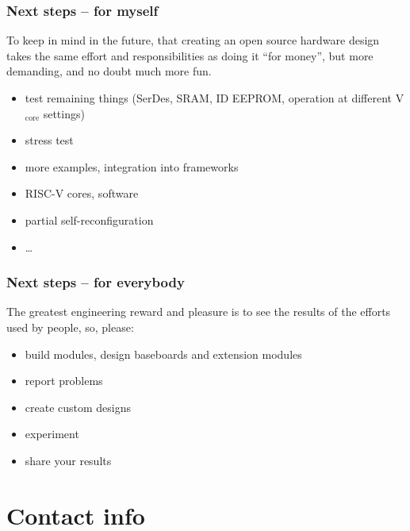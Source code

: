 \begin{frame}
  \frametitle{Next steps -- for myself}

  To keep in mind in the future, that creating an open source hardware
  design takes the same effort and responsibilities as doing it ``for
  money'', but more demanding, and no doubt much more fun.

  \vspace{.5cm}

  \begin{itemize}
  \item test remaining things (SerDes, SRAM, ID EEPROM,
  operation at different V$_{\text{core}}$ settings)
  \item stress test
  \item more examples, integration into frameworks
  \item RISC-V cores, software
  \item partial self-reconfiguration
  \item \dots
  \end{itemize}
\end{frame}

\begin{frame}
  \frametitle{Next steps -- for everybody}

  The greatest engineering reward and pleasure is to see the results
  of the efforts used by people, so, please:

  \vspace{.5cm}

  \begin{itemize}
  \item build modules, design baseboards and extension modules
  \item report problems
  \item create custom designs
  \item experiment
  \item share your results
  \end{itemize}

\end{frame}

\section{Contact info}



